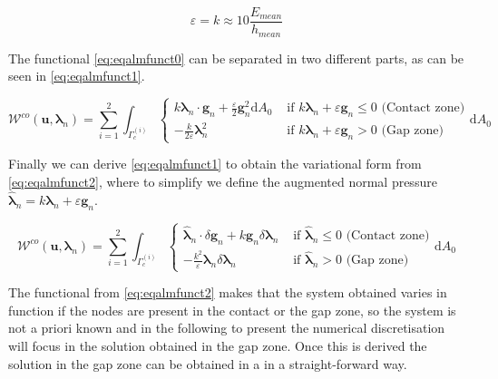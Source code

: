 \documentclass[a4paper,10pt]{article} %
\begin{document}
\begin{equation}\label{eq:eqcoeff}
 \varepsilon = k \approx 10 \frac{E_{mean}}{h_{mean}}
\end{equation}

The functional \eqref{eq:eqalmfunct0} can be separated in two different parts, as can be seen in \eqref{eq:eqalmfunct1}.

\begin{equation}\label{eq:eqalmfunct1}
  \mathcal{W}^{co}(\mathbf{u},\boldsymbol{\lambda}_n) = \sum_{i = 1}^2 \int_{\Gamma_c^{(i)}} \begin{cases}  k \boldsymbol{\lambda}_n \cdot \mathbf{g}_n  + \frac{\varepsilon}{2} \mathbf{g}_n^2 \text{d}A_0 & \text{ if } k\boldsymbol{\lambda}_n +\varepsilon \mathbf{g}_n \leq 0 \text{ (Contact zone)} \\ - \frac{k}{2\varepsilon} \boldsymbol{\lambda}_n^2   & \text{ if } k\boldsymbol{\lambda}_n +\varepsilon \mathbf{g}_n > 0 \text{ (Gap zone)} \end{cases}\text{d}A_0 
\end{equation}

Finally we can derive \eqref{eq:eqalmfunct1} to obtain the variational form from \eqref{eq:eqalmfunct2}, where to simplify we define the augmented normal pressure $\hat{\boldsymbol{\lambda}}_{n} = k\boldsymbol{\lambda}_n +\varepsilon \mathbf{g}_n $.

\begin{equation}\label{eq:eqalmfunct2}
  \mathcal{W}^{co}(\mathbf{u},\boldsymbol{\lambda}_n) = \sum_{i = 1}^2 \int_{\Gamma_c^{(i)}}\begin{cases}  \hat{\boldsymbol{\lambda}}_{n} \cdot \delta\mathbf{g}_n + k \mathbf{g}_n \delta\boldsymbol{\lambda}_n & \text{ if } \hat{\boldsymbol{\lambda}}_{n} \leq 0 \text{ (Contact zone)} \\  - \frac{k^2}{\varepsilon} \boldsymbol{\lambda}_n \delta\boldsymbol{\lambda}_n & \text{ if } \hat{\boldsymbol{\lambda}}_{n} > 0 \text{ (Gap zone)} \end{cases} \text{d}A_0 
\end{equation}

The functional from \eqref{eq:eqalmfunct2} makes that the system obtained varies in function if the nodes are present in the contact or the gap zone, so the system is not a priori known and in the following to present the numerical discretisation will focus in the solution obtained in the gap zone. Once this is derived the solution in the gap zone can be obtained in a in a straight-forward way.
\end{document}
